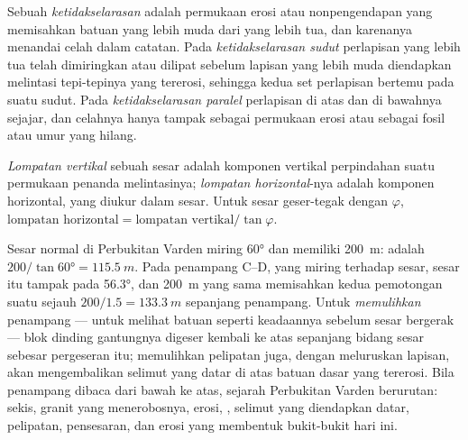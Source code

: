 \begin{definition}\label{def:b1:cross-sections:unconformity}
Sebuah \emph{ketidakselarasan} adalah permukaan erosi atau nonpengendapan yang memisahkan batuan yang lebih muda dari yang lebih tua, dan karenanya menandai celah dalam catatan. Pada \emph{ketidakselarasan sudut} perlapisan yang lebih tua telah dimiringkan atau dilipat sebelum lapisan yang lebih muda diendapkan melintasi tepi-tepinya yang tererosi, sehingga kedua set perlapisan bertemu pada suatu sudut. Pada \emph{ketidakselarasan paralel} perlapisan di atas dan di bawahnya sejajar, dan celahnya hanya tampak sebagai permukaan erosi atau sebagai fosil atau umur yang hilang.
\end{definition}

\begin{definition}\label{def:b1:cross-sections:throw}
\emph{Lompatan vertikal} sebuah sesar adalah komponen vertikal perpindahan suatu permukaan penanda melintasinya; \emph{lompatan horizontal}-nya adalah komponen horizontal, yang diukur dalam  sesar. Untuk sesar geser-tegak dengan  $\varphi$,
$\text{lompatan horizontal} = \text{lompatan vertikal}/\tan\varphi$.
\end{definition}

Sesar normal di Perbukitan Varden miring \ang{60} dan memiliki  \qty{200}{m}:  adalah $200/\tan\ang{60} = \qty{115.5}{m}$. Pada penampang C--D, yang miring terhadap  sesar, sesar itu tampak pada \ang{56.3}, dan  \qty{200}{m} yang sama memisahkan kedua pemotongan suatu  sejauh $200/1.5 = \qty{133.3}{m}$ sepanjang penampang. Untuk \emph{memulihkan} penampang --- untuk melihat batuan seperti keadaannya sebelum sesar bergerak --- blok dinding gantungnya digeser kembali ke atas sepanjang bidang sesar sebesar pergeseran itu; memulihkan pelipatan juga, dengan meluruskan lapisan, akan mengembalikan selimut yang datar di atas batuan dasar yang tererosi. Bila penampang dibaca dari bawah ke atas, sejarah Perbukitan Varden berurutan: sekis, granit yang menerobosnya, erosi, , selimut yang diendapkan datar, pelipatan, pensesaran, dan erosi yang membentuk bukit-bukit hari ini.

